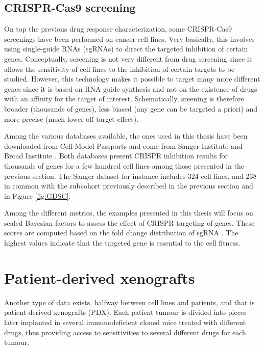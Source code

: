 \documentclass[a4paper,12pt,twoside,onecolumn,openright,final,oldfontcommands]{memoir}
\begin{document}
\subsection{CRISPR-Cas9 screening}\label{appendix-CRISPR}

On top the previous drug response characterization, some CRISPR-Cas9
screenings have been performed on cancer cell lines. Very basically,
this involves using single-guide RNAs (sgRNAs) to direct the targeted
inhibition of certain genes. Conceptually, screening is not very
different from drug screening since it allows the sensitivity of cell
lines to the inhibition of certain targets to be studied. However, this
technology makes it possible to target many more different genes since
it is based on RNA guide synthesis and not on the existence of drugs
with an affinity for the target of interest. Schematically, sreening is
therefore broader (thousands of genes), less biased (any gene can be
targeted a priori) and more precise (much lower off-target effect).

Among the various databases available, the ones used in this thesis have
been downloaded from Cell Model Passports and come from Sanger Institute
\citep{behan2019prioritization} and Broad Institute
\citep{meyers2017computational}. Both databases present CRISPR
inhibition results for thousands of genes for a few hundred cell lines
among those presented in the previous section. The Sanger dataset for
instance includes 324 cell lines, and 238 in common with the subcohort
previously described in the previous section and in Figure
\ref{fig:GDSC}.

Among the different metrics, the examples presented in this thesis will
focus on scaled Bayesian factors to assess the effect of CRISPR
targeting of genes. These scores are computed based on the fold change
distribution of sgRNA \citep{hart2016bagel}. The highest values indicate
that the targeted gene is essential to the cell fitness.

\section{Patient-derived xenografts}\label{appendix-PDX}

Another type of data exists, halfway between cell lines and patients,
and that is patient-derived xenografts (PDX). Each patient tumour is
divided into pieces later implanted in several immunodeficient cloned
mice treated with different drugs, thus providing access to
sensitivities to several different drugs for each tumour.
\end{document}
